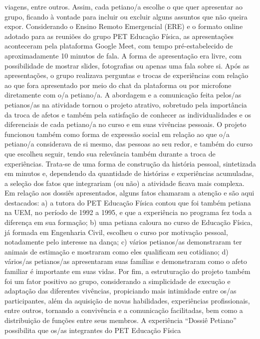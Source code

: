viagens, entre outros. Assim, cada petiano/a escolhe o que quer apresentar ao grupo, ficando à 
vontade para incluir ou excluir alguns assuntos que não queira expor.
Considerando o Ensino Remoto Emergencial (ERE) e o formato online adotado para as 
reuniões do grupo PET Educação Física, as apresentações aconteceram pela plataforma Google 
Meet, com tempo pré-estabelecido de aproximadamente 10 minutos de fala. A forma de 
apresentação era livre, com possibilidade de mostrar slides, fotografias ou apenas uma fala sobre 
si. Após as apresentações, o grupo realizava perguntas e trocas de experiências com relação ao que 
fora apresentado por meio do chat da plataforma ou por microfone diretamente com o/a petiano/a.
A abordagem e a comunicação feita pelos/as petianos/as na atividade tornou o projeto 
atrativo, sobretudo pela importância da troca de afetos e também pela satisfação de conhecer as 
individualidades e os diferenciais de cada petiano/a no curso e em suas vivências pessoais. O 
projeto funcionou também como forma de expressão social em relação ao que o/a petiano/a
considerava de si mesmo, das pessoas ao seu redor, e também do curso que escolheu seguir, tendo 
sua relevância também durante a troca de experiências. Trata-se de uma forma de construção da 
história pessoal, sintetizada em minutos e, dependendo da quantidade de histórias e experiências
acumuladas, a seleção dos fatos que integrariam (ou não) a atividade ficava mais complexa.
Em relação aos dossiês apresentados, alguns fatos chamaram a atenção e são aqui 
destacados: a) a tutora do PET Educação Física contou que foi também petiana na UEM, no 
período de 1992 a 1995, e que a experiência no programa fez toda a diferença em sua formação; 
b) uma petiana caloura no curso de Educação Física, já formada em Engenharia Civil, escolheu o 
curso por motivação pessoal, notadamente pelo interesse na dança; c) vários petianos/as 
demonstraram ter animais de estimação e mostraram como eles qualificam seu cotidiano; d) 
vários/as petianos/as apresentaram suas famílias e demonstraram como o afeto familiar é 
importante em suas vidas. Por fim, a estruturação do projeto também foi um fator positivo ao 
grupo, considerando a simplicidade de execução e adaptação das diferentes vivências, propiciando 
mais intimidade entre os/as participantes, além da aquisição de novas habilidades, experiências 
profissionais, entre outros, tornando a convivência e a comunicação facilitadas, bem como a 
distribuição de funções entre seus membros.
A experiência “Dossiê Petiano” possibilita que os/as integrantes do PET Educação Física 
